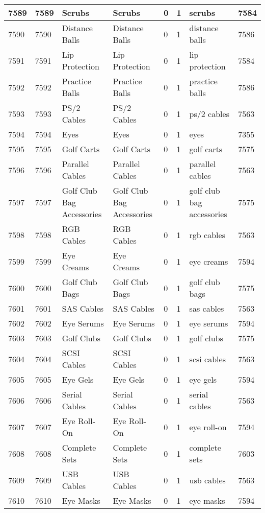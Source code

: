 \begin{longtable}{|l|l|l|l|l|l|l|l|}
7589 & 7589 & Scrubs & Scrubs & 0 & 1 & scrubs & 7584 \\ \hline 
7590 & 7590 & Distance Balls & Distance Balls & 0 & 1 & distance balls & 7586 \\ \hline 
7591 & 7591 & Lip Protection & Lip Protection & 0 & 1 & lip protection & 7584 \\ \hline 
7592 & 7592 & Practice Balls & Practice Balls & 0 & 1 & practice balls & 7586 \\ \hline 
7593 & 7593 & PS/2 Cables & PS/2 Cables & 0 & 1 & ps/2 cables & 7563 \\ \hline 
7594 & 7594 & Eyes & Eyes & 0 & 1 & eyes & 7355 \\ \hline 
7595 & 7595 & Golf Carts & Golf Carts & 0 & 1 & golf carts & 7575 \\ \hline 
7596 & 7596 & Parallel Cables & Parallel Cables & 0 & 1 & parallel cables & 7563 \\ \hline 
7597 & 7597 & Golf Club Bag Accessories & Golf Club Bag Accessories & 0 & 1 & golf club bag accessories & 7575 \\ \hline 
7598 & 7598 & RGB Cables & RGB Cables & 0 & 1 & rgb cables & 7563 \\ \hline 
7599 & 7599 & Eye Creams & Eye Creams & 0 & 1 & eye creams & 7594 \\ \hline 
7600 & 7600 & Golf Club Bags & Golf Club Bags & 0 & 1 & golf club bags & 7575 \\ \hline 
7601 & 7601 & SAS Cables & SAS Cables & 0 & 1 & sas cables & 7563 \\ \hline 
7602 & 7602 & Eye Serums & Eye Serums & 0 & 1 & eye serums & 7594 \\ \hline 
7603 & 7603 & Golf Clubs & Golf Clubs & 0 & 1 & golf clubs & 7575 \\ \hline 
7604 & 7604 & SCSI Cables & SCSI Cables & 0 & 1 & scsi cables & 7563 \\ \hline 
7605 & 7605 & Eye Gels & Eye Gels & 0 & 1 & eye gels & 7594 \\ \hline 
7606 & 7606 & Serial Cables & Serial Cables & 0 & 1 & serial cables & 7563 \\ \hline 
7607 & 7607 & Eye Roll-On & Eye Roll-On & 0 & 1 & eye roll-on & 7594 \\ \hline 
7608 & 7608 & Complete Sets & Complete Sets & 0 & 1 & complete sets & 7603 \\ \hline 
7609 & 7609 & USB Cables & USB Cables & 0 & 1 & usb cables & 7563 \\ \hline 
7610 & 7610 & Eye Masks & Eye Masks & 0 & 1 & eye masks & 7594 \\ \hline 

\end{longtable}
